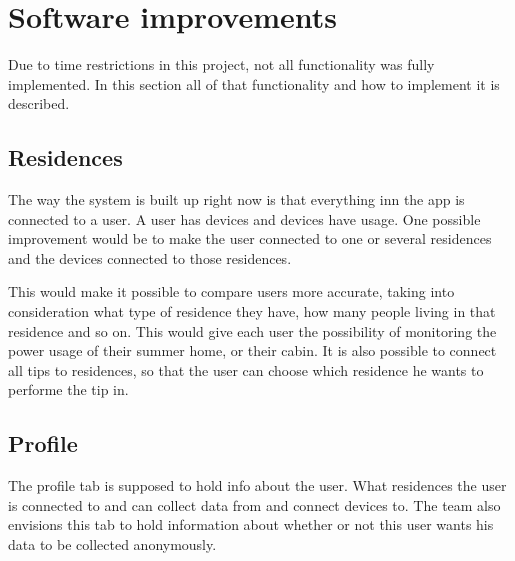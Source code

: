 \section{Software improvements}
Due to time restrictions in this project, not all functionality was fully implemented. In this section all of that functionality and how to implement it is described. 

\subsection{Residences}
The way the system is built up right now is that everything inn the app is connected to a user. A user has devices and devices have usage. One possible improvement would be to make the user connected to one or several residences and the devices connected to those residences. 

This would make it possible to compare users more accurate, taking into consideration what type of residence they have, how many people living in that residence and so on. This would give each user the possibility of monitoring the power usage of their summer home, or their cabin. It is also possible to connect all tips to residences, so that the user can choose which residence he wants to performe the tip in. 

\subsection{Profile}

The profile tab is supposed to hold info about the user. What residences the user is connected to and can collect data from and connect devices to. The team also envisions this tab to hold information about whether or not this user wants his data to be collected anonymously. 

